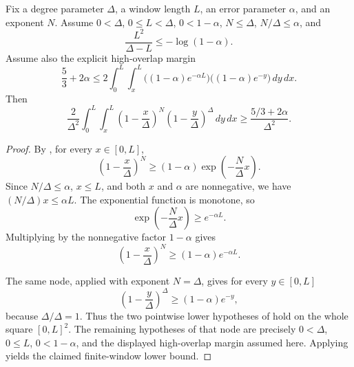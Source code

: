\begin{helper}
Fix a degree parameter $\Delta$, a window length $L$, an error parameter
$\alpha$, and an exponent $N$.  Assume $0<\Delta$, $0\le L<\Delta$,
$0<1-\alpha$, $N\le\Delta$,
$N/\Delta\le\alpha$, and
\[
\frac{L^2}{\Delta-L}\le -\log(1-\alpha).
\]
Assume also the explicit high-overlap margin
\[
\frac53+2\alpha\le
2\int_{0}^{L}\int_x^L
\bigl((1-\alpha)e^{-\alpha L}\bigr)
\bigl((1-\alpha)e^{-y}\bigr)\,dy\,dx .
\]
Then
\[
\frac2{\Delta^2}
\int_{0}^{L}\int_x^L
\left(1-\frac{x}{\Delta}\right)^N
\left(1-\frac{y}{\Delta}\right)^\Delta\,dy\,dx
\ge
\frac{5/3+2\alpha}{\Delta^2}.
\]
\end{helper}
\begin{proof}
By , for every
$x\in[0,L]$,
\[
\left(1-\frac{x}{\Delta}\right)^N
\ge
(1-\alpha)\exp\!\left(-\frac{N}{\Delta}x\right).
\]
Since $N/\Delta\le\alpha$, $x\le L$, and both $x$ and $\alpha$ are
nonnegative, we have $(N/\Delta)x\le\alpha L$.  The exponential function is
monotone, so
\[
\exp\!\left(-\frac{N}{\Delta}x\right)\ge e^{-\alpha L}.
\]
Multiplying by the nonnegative factor $1-\alpha$ gives
\[
\left(1-\frac{x}{\Delta}\right)^N
\ge (1-\alpha)e^{-\alpha L}.
\]

The same node, applied with exponent $N=\Delta$, gives for every
$y\in[0,L]$
\[
\left(1-\frac{y}{\Delta}\right)^\Delta
\ge (1-\alpha)e^{-y},
\]
because $\Delta/\Delta=1$.  Thus the two pointwise lower hypotheses of
 hold on the whole square
$[0,L]^2$.  The remaining hypotheses of that node are precisely
$0<\Delta$, $0\le L$, $0<1-\alpha$, and the displayed high-overlap margin
assumed here.  Applying  yields
the claimed finite-window lower bound.
\end{proof}

